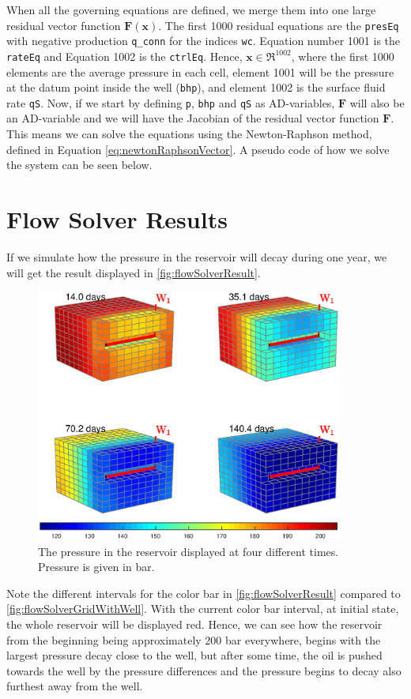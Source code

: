 When all the governing equations are defined, we merge them into one large residual vector function $\boldsymbol{F}(\boldsymbol{x})$. The first 1000 residual equations are the \texttt{presEq} with negative production \texttt{q\_conn} for the indices \texttt{wc}. Equation number 1001 is the \texttt{rateEq} and Equation 1002 is the \texttt{ctrlEq}. Hence, $\boldsymbol{x}\in\Re^{1002}$, where the first 1000 elements are the average pressure in each cell, element 1001 will be the pressure at the datum point inside the well (\texttt{bhp}), and element 1002 is the surface fluid rate \texttt{qS}. Now, if we start by defining \texttt{p}, \texttt{bhp} and \texttt{qS} as AD-variables, $\boldsymbol{F}$ will also be an AD-variable and we will have the Jacobian of the residual vector function $\boldsymbol{F}$. This means we can solve the equations using the Newton-Raphson method, defined in Equation \eqref{eq:newtonRaphsonVector}. A pseudo code of how we solve the system can be seen below.
\newpage


\section{Flow Solver Results}
If we simulate how the pressure in the reservoir will decay during one year, we will get the result displayed in \autoref{fig:flowSolverResult}.
\begin{figure}[H]
    \centering
    \includegraphics[width = 0.9\textwidth]{figures/flowSolver_result.eps}
    \caption{The pressure in the reservoir displayed at four different times. Pressure is given in bar.}
    \label{fig:flowSolverResult}
\end{figure}
Note the different intervals for the color bar in \autoref{fig:flowSolverResult} compared to \autoref{fig:flowSolverGridWithWell}. With the current color bar interval, at initial state, the whole reservoir will be displayed red. Hence, we can see how the reservoir from the beginning being approximately 200 bar everywhere, begins with the largest pressure decay close to the well, but after some time, the oil is pushed towards the well by the pressure differences and the pressure begins to decay also furthest away from the well. 

